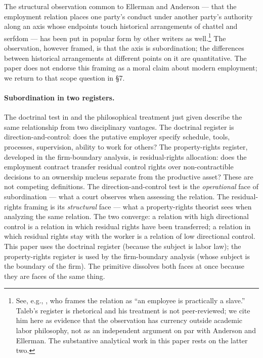\documentclass[11pt,a4paper]{article}
\theoremstyle{remark}
\begin{document}
The structural observation common to Ellerman and Anderson --- that
the employment relation places one party's conduct under another
party's authority along an axis whose endpoints touch
historical arrangements of chattel and serfdom --- has been put
in popular form by other writers as well.\footnote{See, e.g.,
\citet[][Book 4, Ch.\ 3, ``How to Legally Own Another
Person'']{taleb2018skin}, who frames the relation as ``an
employee is practically a slave.'' Taleb's register is rhetorical
and his treatment is not peer-reviewed; we cite him here as
evidence that the observation has currency outside academic labor
philosophy, not as an independent argument on par with Anderson
and Ellerman. The substantive analytical work in this paper rests
on the latter two.} The observation, however framed, is that the
axis is subordination; the differences between historical
arrangements at different points on it are quantitative. The
paper does not endorse this framing as a moral claim about
modern employment; we return to that scope question in §7.

\paragraph{Subordination in two registers.}
The doctrinal test in  and the
philosophical treatment just given describe the same
relationship from two disciplinary vantages. The doctrinal register
is direction-and-control: does the putative employer specify
schedule, tools, processes, supervision, ability to work for
others? The property-rights register, developed in the
firm-boundary analysis, is residual-rights allocation: does the
employment contract
transfer residual control rights over non-contractible decisions
to an ownership nucleus separate from the productive asset?
These are not competing definitions. The direction-and-control
test is the \emph{operational} face of subordination --- what a
court observes when assessing the relation. The residual-rights
framing is its \emph{structural} face --- what a property-rights
theorist sees when analyzing the same relation. The two
converge: a relation with high directional control is a relation
in which residual rights have been transferred; a relation in
which residual rights stay with the worker is a relation of low
directional control. This paper uses the doctrinal register
(because the subject is labor law); the property-rights register
is used by the firm-boundary analysis (whose subject is the
boundary of the firm). The primitive dissolves both faces at
once because they are faces of the same thing.
\end{document}
